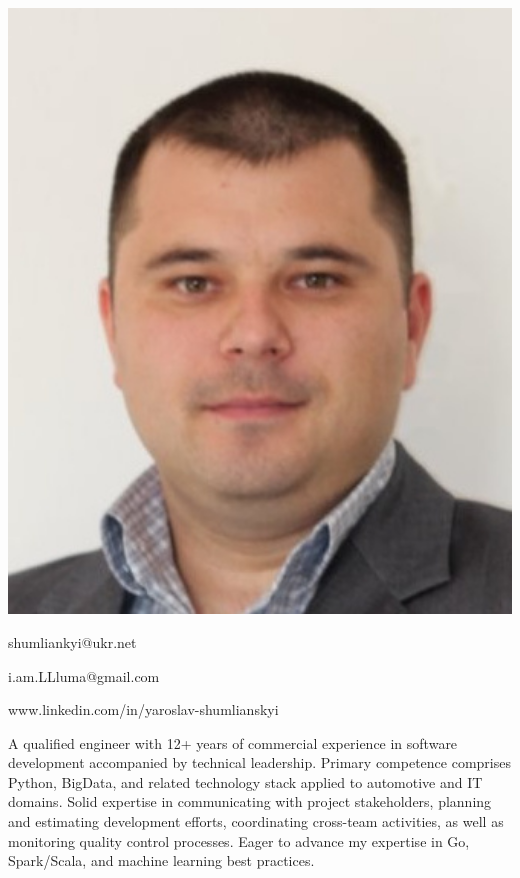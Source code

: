 \documentclass[paper=a4,fontsize=11pt]{temp} %
\begin{document}
\begin{minipage}{.2\linewidth}
   \includegraphics[width=1\textwidth]{IMG/photo}
\end{minipage}
\begin{minipage}{0.7\linewidth}
   \sepspace
   \noindent

   \hfill shumliankyi@ukr.net

   \hfill i.am.LLluma@gmail.com

   \hfill www.linkedin.com/in/yaroslav-shumlianskyi


\end{minipage}


A qualified engineer with 12+ years of commercial experience in software development accompanied by technical
leadership.
Primary competence comprises Python, BigData, and related technology stack applied to automotive and IT domains.
Solid expertise in communicating with project stakeholders, planning and estimating development efforts, coordinating
cross-team activities, as well as monitoring quality control processes.
Eager to advance my expertise in Go, Spark/Scala, and machine learning best practices.
\end{document}
